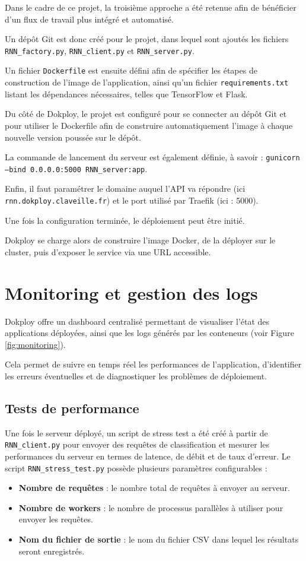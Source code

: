 \documentclass{rapportClass} %
\begin{document}
\smallskip
Dans le cadre de ce projet, la troisième approche a été retenue afin
de bénéficier d'un flux de travail plus intégré et automatisé.

\smallskip
Un dépôt Git est donc créé pour le projet, dans lequel sont ajoutés
les fichiers \texttt{RNN\_factory.py}, \texttt{RNN\_client.py} et
\texttt{RNN\_server.py}.

\smallskip
Un fichier \texttt{Dockerfile} est ensuite défini afin de spécifier
les étapes de construction de l'image de l'application, ainsi qu'un
fichier \texttt{requirements.txt} listant les dépendances nécessaires,
telles que TensorFlow et Flask.


\smallskip
Du côté de Dokploy, le projet est configuré pour se connecter au dépôt
Git et pour utiliser le Dockerfile afin de construire automatiquement
l'image à chaque nouvelle version poussée sur le dépôt.

\smallskip
La commande de lancement du serveur est également définie, à savoir :
\texttt{gunicorn --bind 0.0.0.0:5000 RNN\_server:app}.

\smallskip
Enfin, il faut paramétrer le domaine auquel l'API va répondre (ici
\texttt{rnn.dokploy.claveille.fr}) et le port utilisé par Traefik (ici : 5000).

\smallskip
Une fois la configuration terminée, le déploiement peut être
initié.

\smallskip
Dokploy se charge alors de construire l'image Docker, de la
déployer sur le cluster, puis d'exposer le service via une URL
accessible.

\section{Monitoring et gestion des logs}
Dokploy offre un dashboard centralisé permettant de visualiser l'état des applications déployées, ainsi que les 
logs générés par les conteneurs (voir Figure \ref{fig:monitoring}).

\smallskip
Cela permet de suivre en temps réel les performances de l'application, 
d'identifier les erreurs éventuelles et de diagnostiquer les problèmes de déploiement. 


\subsection{Tests de performance}
Une fois le serveur déployé, un script de stress test a été créé à partir de \texttt{RNN\_client.py} pour envoyer des requêtes
de classification et mesurer les performances du serveur en termes de latence, de débit et de taux d'erreur.
Le script \texttt{RNN\_stress\_test.py} possède plusieurs paramètres configurables :
\begin{itemize}
\item \textbf{Nombre de requêtes} : le nombre total de requêtes à envoyer au serveur.
\item \textbf{Nombre de workers} : le nombre de processus parallèles à utiliser pour envoyer les requêtes.
\item \textbf{Nom du fichier de sortie} : le nom du fichier CSV dans lequel les résultats seront enregistrés.
\end{itemize}
\end{document}
